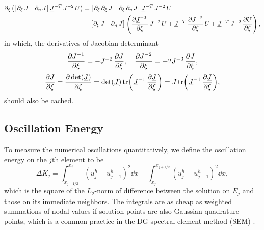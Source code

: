 \documentclass[10pt,draft]{article}
\begin{document}
$$
\begin{aligned}\partial_{\xi}\left(\mathinner{\begin{bmatrix}\partial_{\xi}\,J & \partial_{\eta}\,J\end{bmatrix}}\underline{J}^{-T}\,J^{-2}\,U\right) & =\mathinner{\begin{bmatrix}\partial_{\xi}\,\partial_{\xi}\,J & \partial_{\xi}\,\partial_{\eta}\,J\end{bmatrix}}\underline{J}^{-T}\,J^{-2}\,U\\
 & +\mathinner{\begin{bmatrix}\partial_{\xi}\,J & \partial_{\eta}\,J\end{bmatrix}}\left(\pdv{\underline{J}^{-T}}{\xi}\,J^{-2}\,U+\underline{J}^{-T}\,\pdv{J^{-2}}{\xi}\,U+\underline{J}^{-T}\,J^{-2}\,\pdv{U}{\xi}\right),
\end{aligned}
$$
in which, the derivatives of Jacobian determinant
$$
\pdv{J^{-1}}{\xi}=-J^{-2}\,\pdv{J}{\xi},\quad\pdv{J^{-2}}{\xi}=-2J^{-3}\,\pdv{J}{\xi},
$$
$$
\pdv{J}{\xi}=\pdv{\det(\underline{J})}{\xi}=\det(\underline{J})\tr(\underline{J}^{-1}\,\pdv{\underline{J}}{\xi})=J\tr(\underline{J}^{-1}\,\pdv{\underline{J}}{\xi}),
$$
should also be cached.

\subsection{Oscillation Energy}
To measure the numerical oscillations quantitatively, we define the oscillation energy on the $j$th element to be
$$
\Delta K_j = \int_{x_{j-1/2}}^{x_{j}}\left(u_{j}^{h}-u_{j-1}^{h}\right)^{2}\dd{x}+\int_{x_{j}}^{x_{j+1/2}}\left(u_{j}^{h}-u_{j+1}^{h}\right)^{2}\dd{x},
$$
which is the square of the $L_2$-norm of difference between the solution on $E_j$ and those on its immediate neighbors.
The integrals are as cheap as weighted summations of nodal values if solution points are also Gaussian quadrature points, which is a common practice in the DG spectral element method (SEM) \cite{Li_2020}.
\end{document}
